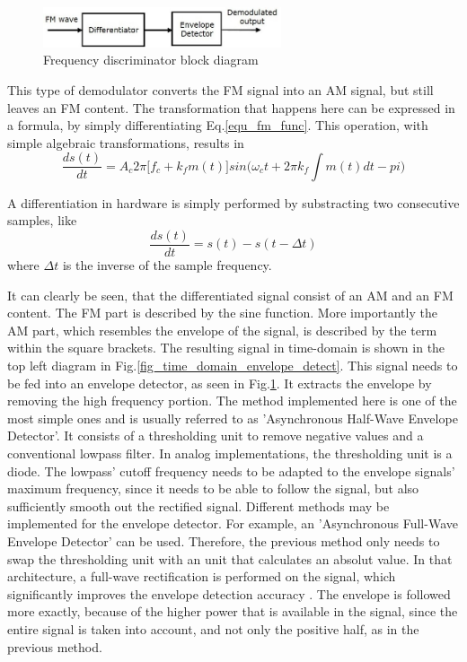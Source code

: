 \documentclass[conference]{IEEEtran}
\begin{document}
    \begin{figure}[!h]
      \centering
        \includegraphics[width=7cm]{img/discrimination_method_bd1.jpg}
      \caption{Frequency discriminator block diagram \cite{ref_fig_freq_discriminator}}
      \label{fig_bd_freq_discriminator}
    \end{figure}

    This type of demodulator converts the FM signal into an AM signal, but still leaves an FM content.
    The transformation that happens here can be expressed in a formula, by simply differentiating Eq.\ref{equ_fm_func}.
    This operation, with simple algebraic transformations, results in
    \begin{equation}
      \frac{d s(t)}{dt} = A_c 2 \pi \Big[f_c + k_f m(t) \Big] sin \Big(\omega_c t + 2 \pi k_f \int m(t) dt -pi \Big)
    \end{equation}

    A differentiation in hardware is simply performed by substracting two consecutive samples, like
    \begin{equation}
      \frac{d s(t)}{dt} = s(t) - s(t-\Delta t)
      \label{equ_differentiator_two_samples}
    \end{equation}
    where $\Delta t$ is the inverse of the sample frequency.

    It can clearly be seen, that the differentiated signal consist of an AM and an FM content.
    The FM part is described by the sine function.
    More importantly the AM part, which resembles the envelope of the signal, is described by the term within the square brackets.
    The resulting signal in time-domain is shown in the top left diagram in Fig.\ref{fig_time_domain_envelope_detect}.
    This signal needs to be fed into an envelope detector, as seen in Fig.\ref{fig_bd_freq_discriminator}.
    It extracts the envelope by removing the high frequency portion.
    The method implemented here is one of the most simple ones and is usually referred to as 'Asynchronous Half-Wave Envelope Detector'\cite{ref_envelope_detector}.
    It consists of a thresholding unit to remove negative values and a conventional lowpass filter.
    In analog implementations, the thresholding unit is a diode.
    The lowpass' cutoff frequency needs to be adapted to the envelope signals' maximum frequency, since it needs to be able to follow the signal, but also sufficiently smooth out the rectified signal.
    Different methods may be implemented for the envelope detector.
    For example, an 'Asynchronous Full-Wave Envelope Detector' can be used.
    Therefore, the previous method only needs to swap the thresholding unit with an unit that calculates an absolut value.
    In that architecture, a full-wave rectification is performed on the signal, which significantly improves the envelope detection accuracy \cite{ref_envelope_detector}.
    The envelope is followed more exactly, because of the higher power that is available in the signal, since the entire signal is taken into account, and not only the positive half, as in the previous method.
\end{document}
